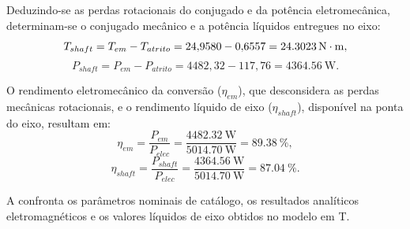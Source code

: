 Deduzindo-se as perdas rotacionais do conjugado e da potência eletromecânica, determinam-se o conjugado mecânico e a potência líquidos entregues no eixo:
\begin{equation}
T_{shaft} = T_{em} - T_{atrito} = 24{,}9580 - 0{,}6557 = \SI{24,3023}{\mathrm{N\cdot m}},
\label{eq:torque_eixo_reconciliado}
\end{equation}
\begin{equation}
P_{shaft} = P_{em} - P_{atrito} = 4482{,}32 - 117{,}76 = \SI{4364,56}{\watt}.
\label{eq:potencia_eixo_reconciliada}
\end{equation}

O rendimento eletromecânico da conversão ($\eta_{em}$), que desconsidera as perdas mecânicas rotacionais, e o rendimento líquido de eixo ($\eta_{shaft}$), disponível na ponta do eixo, resultam em:
\begin{equation}
\eta_{em} = \frac{P_{em}}{P_{elec}} = \frac{\SI{4482,32}{\watt}}{\SI{5014,70}{\watt}} = \SI{89,38}{\percent},
\label{eq:rendimento_eletromagnetico}
\end{equation}
\begin{equation}
\eta_{shaft} = \frac{P_{shaft}}{P_{elec}} = \frac{\SI{4364,56}{\watt}}{\SI{5014,70}{\watt}} = \SI{87,04}{\percent}.
\label{eq:rendimento_eixo}
\end{equation}

A  confronta os parâmetros nominais de catálogo, os resultados analíticos eletromagnéticos e os valores líquidos de eixo obtidos no modelo em T.

